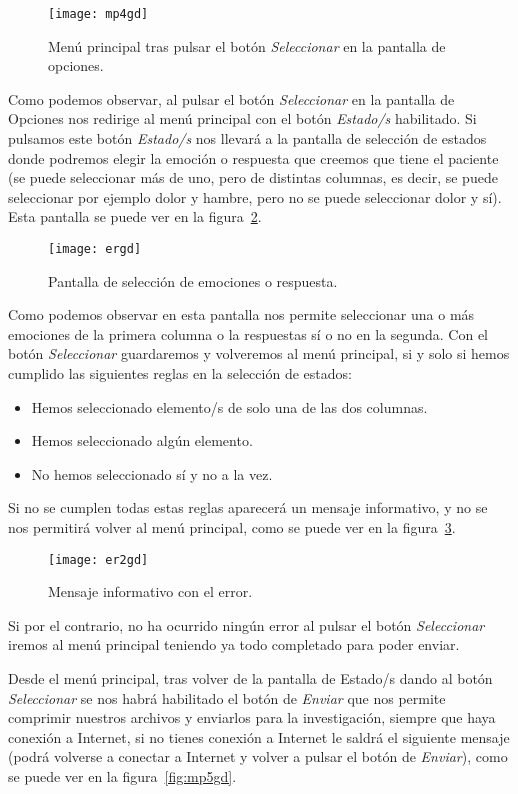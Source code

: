 \begin{figure}
	\centering
	\texttt{[image: mp4gd]}
	\caption{Menú principal tras pulsar el botón \textit{Seleccionar} en la pantalla de opciones.}
	\label{fig:mp4gd}
\end{figure}

Como podemos observar, al pulsar el botón \textit{Seleccionar} en la pantalla de Opciones nos redirige al menú principal con el botón \textit{Estado/s} habilitado. Si pulsamos este botón \textit{Estado/s} nos llevará a la pantalla de selección de estados donde podremos elegir la emoción o respuesta que creemos que tiene el paciente (se puede seleccionar más de uno, pero de distintas columnas, es decir, se puede seleccionar por ejemplo dolor y hambre, pero no se puede seleccionar dolor y sí). Esta pantalla se puede ver en la figura~\ref{fig:ergd}.

\begin{figure}[H]
	\centering
	\texttt{[image: ergd]}
	\caption{Pantalla de selección de emociones o respuesta.}
	\label{fig:ergd}
\end{figure}

Como podemos observar en esta pantalla nos permite seleccionar una o más emociones de la primera columna o la respuestas sí o no en la segunda. Con el botón \textit{Seleccionar} guardaremos y volveremos al menú principal, si y solo si hemos cumplido las siguientes reglas en la selección de estados:
\begin{itemize}
	\item Hemos seleccionado elemento/s de solo una de las dos columnas.
	\item Hemos seleccionado algún elemento.
	\item No hemos seleccionado sí y no a la vez.
\end{itemize}

Si no se cumplen todas estas reglas aparecerá un mensaje informativo, y no se nos permitirá volver al menú principal, como se puede ver en la figura~\ref{fig:er2gd}.
\begin{figure}
	\centering
	\texttt{[image: er2gd]}
	\caption{Mensaje informativo con el error.}
	\label{fig:er2gd}
\end{figure}
Si por el contrario, no ha ocurrido ningún error al pulsar el botón \textit{Seleccionar} iremos al menú principal teniendo ya todo completado para poder enviar.

Desde el menú principal, tras volver de la pantalla de Estado/s dando al botón \textit{Seleccionar} se nos habrá habilitado el botón de \textit{Enviar} que nos permite comprimir nuestros archivos y enviarlos para la investigación, siempre que haya conexión a Internet, si no tienes conexión a Internet le saldrá el siguiente mensaje (podrá volverse a conectar a Internet y volver a pulsar el botón de \textit{Enviar}), como se puede ver en la figura~\ref{fig:mp5gd}.

